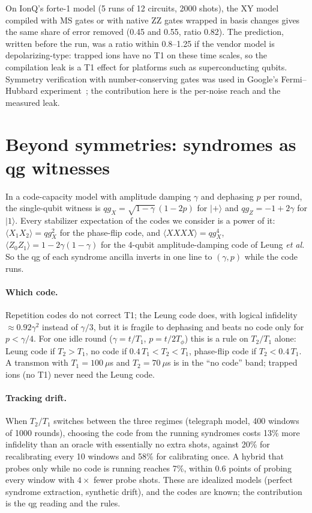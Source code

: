 \documentclass[11pt]{article}
\newcommand{\qgZ}{qg_Z}
\newcommand{\qgX}{qg_X}
\begin{document}
On IonQ's forte-1 model (5 runs of 12 circuits, 2000 shots), the XY model compiled with MS gates or
with native ZZ gates wrapped in basis changes gives the same share of error removed (0.45 and 0.55,
ratio 0.82). The prediction, written before the run, was a ratio within 0.8--1.25 if the vendor model
is depolarizing-type: trapped ions have no T1 on these time scales, so the compilation leak is a T1
effect for platforms such as superconducting qubits. Symmetry verification with number-conserving
gates was used in Google's Fermi--Hubbard experiment~\cite{arute2020hubbard}; the contribution here
is the per-noise reach and the measured leak.

\section{Beyond symmetries: syndromes as qg witnesses}\label{sec:qec}

In a code-capacity model with amplitude damping $\gamma$ and dephasing $p$ per round, the single-qubit
witness is $\qgX=\sqrt{1-\gamma}\,(1-2p)$ for $|+\rangle$ and $\qgZ=-1+2\gamma$ for $|1\rangle$. Every
stabilizer expectation of the codes we consider is a power of it: $\langle X_1X_2\rangle=\qgX^{2}$ for
the phase-flip code, and $\langle XXXX\rangle=\qgX^{4}$, $\langle Z_0Z_1\rangle=1-2\gamma(1-\gamma)$ for
the 4-qubit amplitude-damping code of Leung \emph{et al.} So the qg of each syndrome ancilla inverts in
one line to $(\gamma,p)$ while the code runs.

\paragraph{Which code.} Repetition codes do not correct T1; the Leung code does, with logical infidelity
$\approx0.92\gamma^2$ instead of $\gamma/3$, but it is fragile to dephasing and beats no code only for
$p<\gamma/4$. For one idle round ($\gamma=t/T_1$, $p=t/2T_\phi$) this is a rule on $T_2/T_1$ alone: Leung
code if $T_2>T_1$, no code if $0.4\,T_1<T_2<T_1$, phase-flip code if $T_2<0.4\,T_1$. A transmon with
$T_1=100~\mu$s and $T_2=70~\mu$s is in the ``no code'' band; trapped ions (no T1) never need the Leung code.

\paragraph{Tracking drift.} When $T_2/T_1$ switches between the three regimes (telegraph model, 400
windows of 1000 rounds), choosing the code from the running syndromes costs 13\% more infidelity than an
oracle with essentially no extra shots, against 20\% for recalibrating every 10 windows and 58\% for
calibrating once. A hybrid that probes only while no code is running reaches 7\%, within 0.6 points of
probing every window with $4\times$ fewer probe shots. These are idealized models (perfect syndrome
extraction, synthetic drift), and the codes are known; the contribution is the qg reading and the rules.
\end{document}
